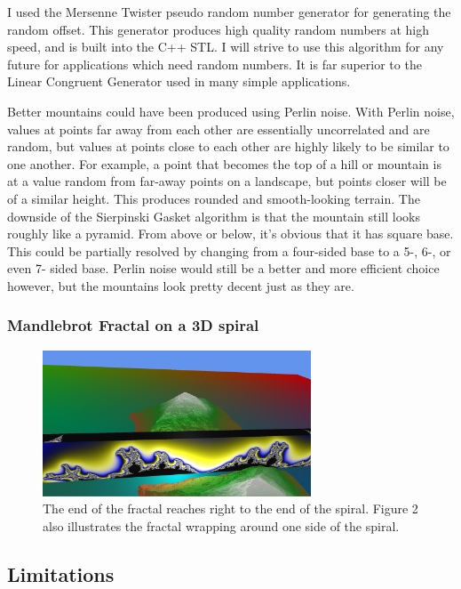 \documentclass[journal]{IEEEtran}
\begin{document}
I used the Mersenne Twister pseudo random number generator for generating the random offset. This generator produces high quality random numbers at high speed, and is built into the C++ STL. I will strive to use this algorithm for any future for applications which need random numbers. It is far superior to the Linear Congruent Generator used in many simple applications.

Better mountains could have been produced using Perlin noise. With Perlin noise, values at points far away from each other are essentially uncorrelated and are random, but values at points close to each other are highly likely to be similar to one another. For example, a point that becomes the top of a hill or mountain is at a value random from far-away points on a landscape, but points closer will be of a similar height. This produces rounded and smooth-looking terrain. The downside of the Sierpinski Gasket algorithm is that the mountain still looks roughly like a pyramid. From above or below, it's obvious that it has square base. This could be partially resolved by changing from a four-sided base to a 5-, 6-, or even 7- sided base. Perlin noise would still be a better and more efficient choice however, but the mountains look pretty decent just as they are.

\subsubsection{Mandlebrot Fractal on a 3D spiral}

\begin{figure}[htbp]
\centering
\fbox
{
	\begin{minipage}{8 cm}
		\includegraphics[width=80mm]{resources/screenshot3.png}
		\caption{The end of the fractal reaches right to the end of the spiral. Figure 2 also illustrates the fractal wrapping around one side of the spiral.}
	\end{minipage}
}
\end{figure}

\subsection{Limitations}
\end{document}

